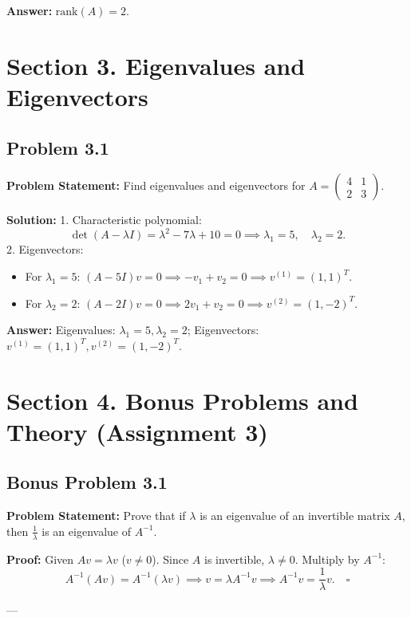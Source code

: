 \documentclass[11pt, a4paper]{article}
\begin{document}
\textbf{Answer:} $\text{rank}(A) = 2$.

\newpage

\section{Section 3. Eigenvalues and Eigenvectors}

\subsection*{Problem 3.1}
\textbf{Problem Statement:} Find eigenvalues and eigenvectors for $A = \begin{pmatrix} 4 & 1 \\ 2 & 3 \end{pmatrix}$.

\textbf{Solution:}
1. Characteristic polynomial:
$$ \det(A - \lambda I) = \lambda^2 - 7\lambda + 10 = 0 \implies \lambda_1 = 5, \quad \lambda_2 = 2. $$
2. Eigenvectors:
\begin{itemize}
\item For $\lambda_1 = 5$: $(A - 5I)v = 0 \implies -v_1 + v_2 = 0 \implies v^{(1)} = (1, 1)^T$.
\item For $\lambda_2 = 2$: $(A - 2I)v = 0 \implies 2v_1 + v_2 = 0 \implies v^{(2)} = (1, -2)^T$.
\end{itemize}

\textbf{Answer:} Eigenvalues: $\lambda_1 = 5, \lambda_2 = 2$; Eigenvectors: $v^{(1)} = (1, 1)^T, v^{(2)} = (1, -2)^T$.

\newpage

\section{Section 4. Bonus Problems and Theory (Assignment 3)}

\subsection*{Bonus Problem 3.1}
\textbf{Problem Statement:} Prove that if $\lambda$ is an eigenvalue of an invertible matrix $A$, then $\frac{1}{\lambda}$ is an eigenvalue of $A^{-1}$.

\textbf{Proof:}
Given $Av = \lambda v$ ($v \neq 0$). Since $A$ is invertible, $\lambda \ne 0$. Multiply by $A^{-1}$:
$$ A^{-1}(Av) = A^{-1}(\lambda v) \implies v = \lambda A^{-1}v \implies A^{-1}v = \frac{1}{\lambda}v. \quad \square $$

---
\end{document}
